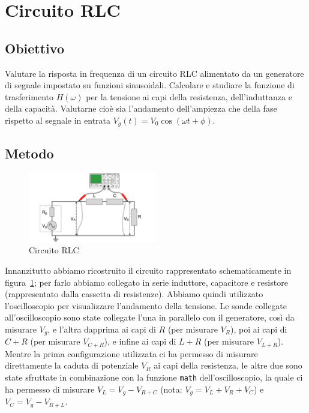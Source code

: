 \documentclass[a4paper]{article}
\begin{document}
\section{Circuito RLC}
\subsection{Obiettivo}
Valutare la risposta in frequenza di un circuito RLC alimentato da un generatore di segnale impostato su funzioni sinusoidali. Calcolare e studiare la funzione di trasferimento $H(\omega)$ per la tensione ai capi della resistenza, dell'induttanza e della capacità. Valutarne cioè sia l’andamento dell’ampiezza che della fase rispetto al segnale in entrata $V_g(t) = V_{0} \cos(\omega t + \phi)$.

\subsection{Metodo}
\begin{figure}[htbp]
	\centering
	\includegraphics[width=0.5\textwidth]{grafici/circuito-rlc.png}
	\caption{Circuito RLC}
	\label{fig:rlc_circuito} 
\end{figure}
Innanzitutto abbiamo ricostruito il circuito rappresentato schematicamente in figura~\ref{fig:rlc_circuito}; per farlo abbiamo collegato in serie induttore, capacitore e resistore (rappresentato dalla cassetta di resistenze). Abbiamo quindi utilizzato l'oscilloscopio per visualizzare l'andamento della tensione. Le sonde collegate all'oscilloscopio sono state collegate l'una in parallelo con il generatore, così da misurare $V_g$, e l'altra dapprima ai capi di $R$ (per misurare $V_R$), poi ai capi di $C + R$ (per misurare $V_{C+R}$), e infine ai capi di $L + R$ (per misurare $V_{L+R}$). Mentre la prima configurazione utilizzata ci ha permesso di misurare direttamente la caduta di potenziale $V_R$ ai capi della resistenza, le altre due sono state sfruttate in combinazione con la funzione \texttt{math} dell'oscilloscopio, la quale ci ha permesso di misurare $V_L = V_g - V_{R+C}$ (nota: $V_g = V_L + V_R + V_C$) e $V_C = V_g - V_{R+L}$. %
\end{document}
